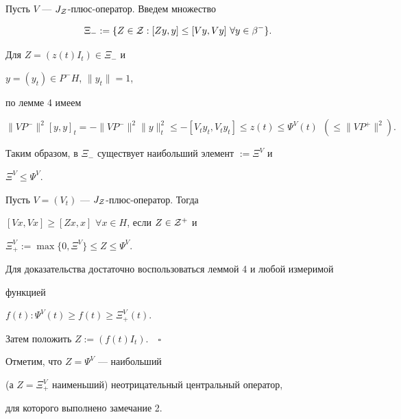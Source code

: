 Пусть $V$ --- $J_{\cal Z}$-плюс-оператор. Введем множество


$$


\Xi_{-} :=\{Z\in {\cal Z}: [Zy,y]\leq [Vy,Vy]


\ \forall y\in \beta^{-}\}.


$$


Для $Z=(z(t)I_{t})\in \Xi_{-}$ и 


$y=(y_{t})\in P^{-}H$, $\| y_{t}\| =1$, 


по лемме 4 имеем


$$


\| VP^{-}\|^{2}[y,y]_{t}=-\| VP^{-}\|^{2}\| y\|^{2}_{t}


\leq -[V_{t}y_{t},V_{t}y_{t}]\leq z(t)\leq \Psi^{V}(t)\ \


(\leq \| VP^{+}\|^{2}).


$$


Таким образом, в $\Xi_{-}$ существует наибольший элемент $:=\Xi^{V}$ и 


$\Xi^{V}\leq \Psi^{V}$.





\begin{note}


Пусть $V=(V_{t})$ --- $J_{\cal Z}$-плюс-оператор. Тогда


$[Vx,Vx]\geq [Zx,x]$ $\forall x\in H$, если $Z\in {\cal Z}^{+}$ и 


$\Xi^{V}_{+}:=\max\{0,\Xi^{V}\}\leq Z\leq\Psi^{V}$.


\end{note}





Для доказательства достаточно воспользоваться леммой 4 и любой измеримой 


функцией


$f(t):\Psi^{V}(t)\geq f(t)\geq \Xi_{+}^{V}(t)$. 


Затем положить $Z:=(f(t)I_{t})$.$\quad\square$


\medskip





Отметим, что $Z=\Psi^{V}$ --- наибольший


(а $Z=\Xi^{V}_{+}$ наименьший) неотрицательный центральный оператор, 


для которого выполнено замечание 2. 






